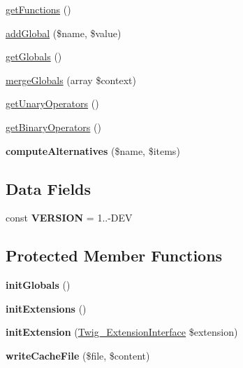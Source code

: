 \begin{DoxyCompactItemize}
\item 
\hyperlink{class_twig___environment_a131c2522f07821f77cd1d038c216031b}{get\+Functions} ()
\item 
\hyperlink{class_twig___environment_ad967754d97f0c9ccd329246fa9255808}{add\+Global} (\$name, \$value)
\item 
\hyperlink{class_twig___environment_ae3a26252ce6efe503698085a7ed69dad}{get\+Globals} ()
\item 
\hyperlink{class_twig___environment_a7e84fd2f4a105b68c7167060ae59b87d}{merge\+Globals} (array \$context)
\item 
\hyperlink{class_twig___environment_a03f904feb2595160e2329a31e3246b3a}{get\+Unary\+Operators} ()
\item 
\hyperlink{class_twig___environment_ac1c8ecccd7414ea56428a303bc47f66b}{get\+Binary\+Operators} ()
\item 
\hypertarget{class_twig___environment_ac9eaf340606e898687d353a69f1a0b61}{}{\bfseries compute\+Alternatives} (\$name, \$items)\label{class_twig___environment_ac9eaf340606e898687d353a69f1a0b61}

\end{DoxyCompactItemize}
\subsection*{Data Fields}
\begin{DoxyCompactItemize}
\item 
\hypertarget{class_twig___environment_af71005841ce53adac00581ab0ba24c1f}{}const {\bfseries V\+E\+R\+S\+I\+O\+N} = \textquotesingle{}1..-\/D\+E\+V\textquotesingle{}\label{class_twig___environment_af71005841ce53adac00581ab0ba24c1f}

\end{DoxyCompactItemize}
\subsection*{Protected Member Functions}
\begin{DoxyCompactItemize}
\item 
\hypertarget{class_twig___environment_a09fabb543f6dd22f9e668ef8f3102312}{}{\bfseries init\+Globals} ()\label{class_twig___environment_a09fabb543f6dd22f9e668ef8f3102312}

\item 
\hypertarget{class_twig___environment_a481cddce0a61550e4616074158cf84f5}{}{\bfseries init\+Extensions} ()\label{class_twig___environment_a481cddce0a61550e4616074158cf84f5}

\item 
\hypertarget{class_twig___environment_ae8f85d11b80d3c925bb98f6711795e87}{}{\bfseries init\+Extension} (\hyperlink{interface_twig___extension_interface}{Twig\+\_\+\+Extension\+Interface} \$extension)\label{class_twig___environment_ae8f85d11b80d3c925bb98f6711795e87}

\item 
\hypertarget{class_twig___environment_afef0e86e8f08fa1d0c4006ce65bede10}{}{\bfseries write\+Cache\+File} (\$file, \$content)\label{class_twig___environment_afef0e86e8f08fa1d0c4006ce65bede10}

\end{DoxyCompactItemize}
